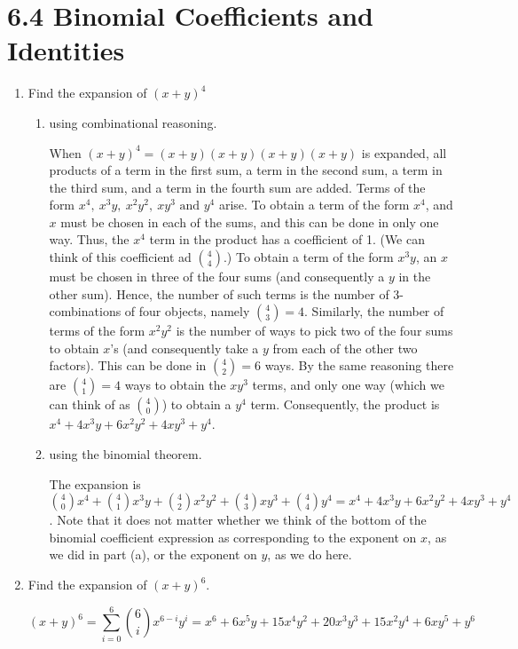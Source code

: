 \documentclass[11pt]{article}
\begin{document}
\section*{\textbf{6.4 Binomial Coefficients and Identities}}
\begin{enumerate}[label=\textbf{\arabic*.}]
	\item Find the expansion of $(x + y)^4$
	
	\begin{enumerate}[label=\textbf{\alph*)}]
		\item using combinational reasoning.
		
		When $(x + y)^4 = (x + y)(x + y)(x + y)(x + y)$ is expanded, all products of a term in the first sum, a term in the second sum, a term in the third sum, and a term in the fourth sum are added. Terms of the form $x^4,\ x^3y,\ x^2y^2,\ xy^3 \text{ and } y^4$ arise. To obtain a term of the form $x^4$, and $x$ must be chosen in each of the sums, and this can be done in only one way. Thus, the $x^4$ term in the product has a coefficient of 1. (We can think of this coefficient ad $\binom{4}{4}$.) To obtain a term of the form $x^3y$, an $x$ must be chosen in three of the four sums (and consequently a $y$ in the other sum). Hence, the number of such terms is the number of 3-combinations of four objects, namely $\binom{4}{3} = 4$. Similarly, the number of terms of the form $x^2y^2$ is the number of ways to pick two of the four sums to obtain $x$'s (and consequently take a $y$ from each of the other two factors). This can be done in $\binom{4}{2} = 6$ ways. By the same reasoning there are $\binom{4}{1} = 4$ ways to obtain the $xy^3$ terms, and only one way (which we can think of as $\binom{4}{0}$) to obtain a $y^4$ term. Consequently, the product is $x^4 + 4x^3y + 6x^2y^2 + 4xy^3 + y^4$.
		
		\item using the binomial theorem.
		
		The expansion is $\binom{4}{0}x^4 + \binom{4}{1}x^3y + \binom{4}{2}x^2y^2 + \binom{4}{3}xy^3 + \binom{4}{4}y^4 = x^4 + 4x^3y + 6x^2y^2 + 4xy^3 + y^4$. Note that it does not matter whether we think of the bottom of the binomial coefficient expression as corresponding to the exponent on $x$, as we did in part (a), or the exponent on $y$, as we do here.
	\end{enumerate}

	\item Find the expansion of $(x + y)^6$.
	
	$$(x + y)^6 = \sum_{i = 0}^{6} \binom{6}{i} x^{6 - i}y^i = x^6 + 6x^5y + 15x^4y^2 + 20x^3y^3 + 15x^2y^4 + 6xy^5 + y^6$$
	

\end{enumerate}
\end{document}
